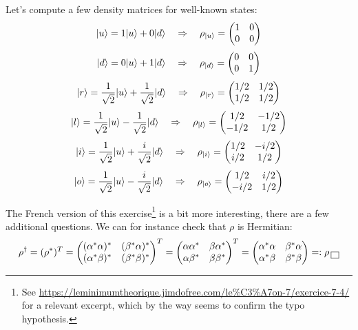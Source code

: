 \documentclass[solutions.tex]{subfiles}
\begin{document}
Let's compute a few density matrices for well-known states:
\[
	\ket{u} = 1\ket{u} + 0\ket{d}\quad\Rightarrow\quad
		\rho_{\ket{u}} = \begin{pmatrix}
			1 & 0 \\
			0 & 0 \\
		\end{pmatrix}
\]
\[
	\ket{d} = 0\ket{u} + 1\ket{d}\quad\Rightarrow\quad
		\rho_{\ket{d}} = \begin{pmatrix}
			0 & 0 \\
			0 & 1 \\
		\end{pmatrix}
\]
\[
	\ket{r} = \frac1{\sqrt2}\ket{u} + \frac1{\sqrt2}\ket{d}\quad\Rightarrow\quad
		\rho_{\ket{r}} = \begin{pmatrix}
			1/2 & 1/2 \\
			1/2 & 1/2 \\
		\end{pmatrix}
\]
\[
	\ket{l} = \frac1{\sqrt2}\ket{u} - \frac1{\sqrt2}\ket{d}\quad\Rightarrow\quad
		\rho_{\ket{l}} = \begin{pmatrix}
			1/2 & -1/2 \\
			-1/2 & 1/2 \\
		\end{pmatrix}
\]
\[
	\ket{i} = \frac1{\sqrt2}\ket{u} + \frac{i}{\sqrt2}\ket{d}\quad\Rightarrow\quad
		\rho_{\ket{i}} = \begin{pmatrix}
			1/2 & -i/2 \\
			i/2 & 1/2 \\
		\end{pmatrix}
\]
\[
	\ket{o} = \frac1{\sqrt2}\ket{u} - \frac{i}{\sqrt2}\ket{d}\quad\Rightarrow\quad
		\rho_{\ket{o}} = \begin{pmatrix}
			1/2 & i/2 \\
			-i/2 & 1/2 \\
		\end{pmatrix}
\]

\hrr

The French version of this exercise\footnote{See
\url{https://leminimumtheorique.jimdofree.com/le\%C3\%A7on-7/exercice-7-4/} for
a relevant excerpt, which by the way seems to confirm the typo hypothesis.}
is a bit more interesting, there are a few additional questions.
We can for instance check that $\rho$ is Hermitian:
\[
	\rho^\dagger = (\rho^*)^T = \begin{pmatrix}
		(\alpha^*\alpha)^* & (\beta^*\alpha)^* \\
		(\alpha^*\beta)^*  & (\beta^*\beta)^* \\
	\end{pmatrix}^T = \begin{pmatrix}
		\alpha\alpha^* & \beta\alpha^* \\
		\alpha\beta^*  & \beta\beta^* \\
	\end{pmatrix}^T = \begin{pmatrix}
		\alpha^*\alpha & \beta^*\alpha \\
		\alpha^*\beta  & \beta^*\beta \\
	\end{pmatrix} =: \rho \qed
\]
\end{document}
